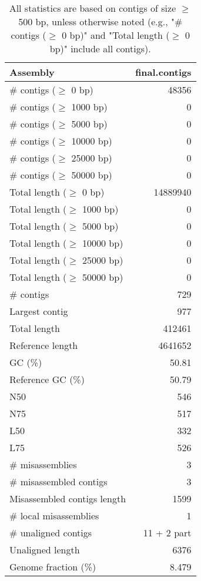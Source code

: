 \documentclass[12pt,a4paper]{article}
\begin{document}
\begin{table}[ht]
\begin{center}
\caption{All statistics are based on contigs of size $\geq$ 500 bp, unless otherwise noted (e.g., "\# contigs ($\geq$ 0 bp)" and "Total length ($\geq$ 0 bp)" include all contigs).}
\begin{tabular}{|l*{1}{|r}|}
\hline
Assembly & final.contigs \\ \hline
\# contigs ($\geq$ 0 bp) & 48356 \\ \hline
\# contigs ($\geq$ 1000 bp) & 0 \\ \hline
\# contigs ($\geq$ 5000 bp) & 0 \\ \hline
\# contigs ($\geq$ 10000 bp) & 0 \\ \hline
\# contigs ($\geq$ 25000 bp) & 0 \\ \hline
\# contigs ($\geq$ 50000 bp) & 0 \\ \hline
Total length ($\geq$ 0 bp) & 14889940 \\ \hline
Total length ($\geq$ 1000 bp) & 0 \\ \hline
Total length ($\geq$ 5000 bp) & 0 \\ \hline
Total length ($\geq$ 10000 bp) & 0 \\ \hline
Total length ($\geq$ 25000 bp) & 0 \\ \hline
Total length ($\geq$ 50000 bp) & 0 \\ \hline
\# contigs & 729 \\ \hline
Largest contig & 977 \\ \hline
Total length & 412461 \\ \hline
Reference length & 4641652 \\ \hline
GC (\%) & 50.81 \\ \hline
Reference GC (\%) & 50.79 \\ \hline
N50 & 546 \\ \hline
N75 & 517 \\ \hline
L50 & 332 \\ \hline
L75 & 526 \\ \hline
\# misassemblies & 3 \\ \hline
\# misassembled contigs & 3 \\ \hline
Misassembled contigs length & 1599 \\ \hline
\# local misassemblies & 1 \\ \hline
\# unaligned contigs & 11 + 2 part \\ \hline
Unaligned length & 6376 \\ \hline
Genome fraction (\%) & 8.479 \\ \hline

\end{tabular}
\end{center}
\end{table}
\end{document}
